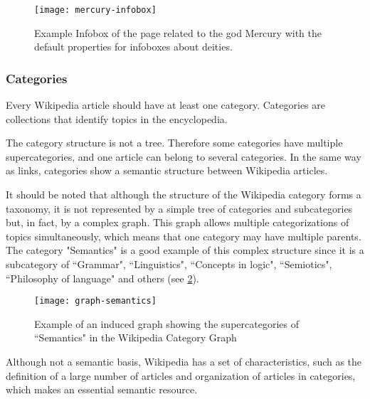 \begin{figure}[!h]
\centering
  \texttt{[image: mercury-infobox]}
  \caption{Example Infobox of the page related to the god Mercury with the default properties for infoboxes about deities.}
  \label{fig:mercury-infobox}
\end{figure}



\subsubsection{\hspace*{3pt} Categories}

Every Wikipedia article should have at least one category. Categories are collections that identify topics in the encyclopedia. 

The category structure is not a tree. Therefore some categories have multiple supercategories, and one article can belong to several categories. In the same way as links, categories show a semantic structure between Wikipedia articles. 

It should be noted that although the structure of the Wikipedia category forms a taxonomy, it is not represented by a simple tree of categories and subcategories but, in fact, by a complex graph. This graph allows multiple categorizations of topics simultaneously, which means that one category may have multiple parents. The category "Semantics" is a good example of this complex structure since it is a subcategory of ``Grammar",  ``Linguistics", ``Concepts in logic", ``Semiotics", ``Philosophy of language" and others (see \ref{fig:semantics-category}).


\begin{figure}[H]
\centering
  \texttt{[image: graph-semantics]}
  \caption{Example of an induced graph showing the supercategories of ``Semantics" in the Wikipedia Category Graph}
  \label{fig:semantics-category}
\end{figure}

Although not a semantic basis, Wikipedia has a set of characteristics, such as the definition of a large number of articles and organization of articles in categories, which makes an essential semantic resource.

